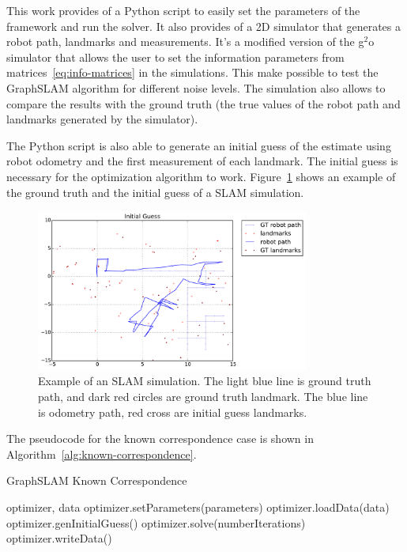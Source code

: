 This work provides of a Python script to easily set the parameters of the framework and run the solver. It also provides of a 2D simulator that generates a robot path, landmarks and measurements. It's a modified version of the g$^2$o simulator that allows the user to set the information parameters from matrices~\eqref{eq:info-matrices} in the simulations. This make possible to test the GraphSLAM algorithm for different noise levels. The simulation also allows to compare the results with the ground truth (the true values of the robot path and landmarks generated by the simulator). 

The Python script is also able to generate an initial guess of the estimate using robot odometry and the first measurement of each landmark. The initial guess is necessary for the optimization algorithm to work. Figure~\ref{fig:simulation} shows an example of the ground truth and the initial guess of a SLAM simulation.

\begin{figure}[htbp!]
    \centering
    \includegraphics[width=0.8\textwidth]{imagenes/guess_op_100_oa_100_lp_100_ds_100.pdf}
    \caption{Example of an SLAM simulation. The light blue line is ground truth path, and dark red circles are ground truth landmark. The blue line is odometry path, red cross are initial guess landmarks.}
    \label{fig:simulation}
\end{figure}

The pseudocode for the known correspondence case is shown in Algorithm~\ref{alg:known-correspondence}.

\begin{algorithm}
    \caption{GraphSLAM Known Correspondence}
    \label{alg:known-correspondence}
    \begin{algorithmic}[1]
        \Require optimizer, data
        \State optimizer.setParameters(parameters)
        \State optimizer.loadData(data)
        \State optimizer.genInitialGuess()
        \State optimizer.solve(numberIterations)
        \State optimizer.writeData()
    \end{algorithmic}
\end{algorithm}

